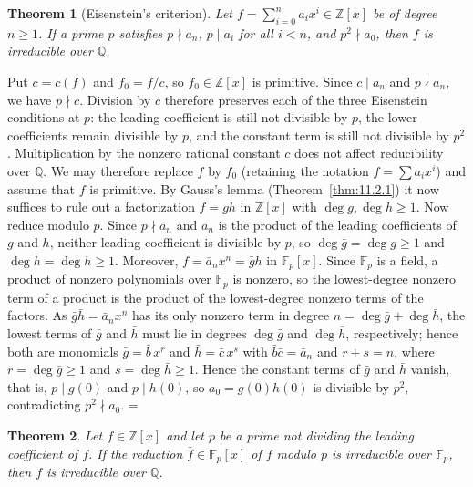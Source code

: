 \documentclass[11pt]{article}
\makeatletter
\let\nt@closedisplay\]
\def\nt@guardedclose{\@ifnextchar\par{\nt@closeafterpar}{\@ifnextchar\end{\postdisplaypenalty\@M\nt@closedisplay}{\nt@closedisplay}}}
\def\nt@closeafterpar\par{\@ifnextchar\par{\nt@closeafterpar}{\@ifnextchar\end{\postdisplaypenalty\@M\nt@closedisplay\par}{\nt@closedisplay\par}}}
\renewenvironment{proof}[1][\proofname]{\par
  \pushQED{\qed}\normalfont\topsep\medskipamount\edef\nt@afterproof{\@endparpenalty=\the\@endparpenalty\relax}\@beginparpenalty\@M\@endparpenalty\@M\let\]\nt@guardedclose\trivlist\item[]\textit{#1\@addpunct{.}} \ignorespaces}{\ifvmode\addpenalty\@M\fi\popQED\nt@afterproof\endtrivlist\@endpefalse}
\theoremstyle{ntstyle}
\newtheorem{theorem}{Theorem}[subsection]
\makeatother
\begin{document}
\begin{theorem}[Eisenstein's criterion]\label{thm:11.3.1}\label{thm:eisenstein-criterion}
  Let $f = \sum_{i=0}^n a_i x^i\in\mathbb{Z}[x]$ be of degree $n\ge1$. If a prime $p$ satisfies $p\nmid a_n$,
  $p\mid a_i$ for all $i<n$, and $p^2\nmid a_0$, then $f$ is
  irreducible over $\mathbb{Q}$.

\end{theorem}

\begin{proof} Put $c=c(f)$ and $f_0=f/c$, so $f_0\in\mathbb{Z}[x]$ is
  primitive. Since $c\mid a_n$ and $p\nmid a_n$, we have $p\nmid c$.
  Division by $c$ therefore preserves each of the three Eisenstein
  conditions at $p$: the leading coefficient is still not divisible by $p$,
  the lower coefficients remain divisible by $p$, and the constant term
  is still not divisible by $p^2$. Multiplication by the nonzero rational
  constant $c$ does not affect reducibility over $\mathbb{Q}$. We may
  therefore replace $f$ by $f_0$ (retaining the notation $f=\sum a_i x^i$)
  and assume that $f$ is primitive. By Gauss's lemma
  (Theorem~\ref{thm:11.2.1}) it now suffices to rule out a factorization $f=gh$ in
  $\mathbb{Z}[x]$ with $\deg g,\deg h\ge1$. Now reduce modulo $p$. Since $p\nmid a_n$ and $a_n$ is the product of
  the leading coefficients of $g$ and $h$, neither leading
  coefficient is divisible by $p$, so $\deg\bar g=\deg g\ge1$ and
  $\deg\bar h=\deg h\ge1$. Moreover, $\bar f = \bar a_n x^n = \bar g\bar h$
  in $\mathbb{F}_p[x]$. Since $\mathbb{F}_p$ is a field, a product of nonzero polynomials over $\mathbb{F}_p$ is
  nonzero, so the lowest-degree nonzero term of a product is the product of the lowest-degree nonzero terms of the
  factors. As $\bar g\bar h=\bar a_n x^n$ has its only nonzero term in degree $n=\deg\bar g+\deg\bar h$, the lowest
  terms of $\bar g$ and $\bar h$ must lie in degrees $\deg\bar g$ and $\deg\bar h$, respectively; hence both are
  monomials $\bar g = \bar b\,x^{r}$ and $\bar h = \bar c\,x^{s}$ with $\bar b\bar c=\bar a_n$
  and $r+s=n$, where $r=\deg\bar g\ge1$ and $s=\deg\bar h\ge1$.
  Hence the constant terms of $\bar g$ and $\bar h$ vanish, that is, $p\mid g(0)$ and $p\mid h(0)$, so
  $a_0 = g(0)h(0)$ is divisible by $p^2$,
  contradicting $p^2\nmid a_0$.
\end{proof}

\begin{theorem}\label{thm:11.3.2} Let $f\in\mathbb{Z}[x]$ and let
  $p$ be a prime not dividing the leading coefficient of $f$. If the
  reduction $\bar f\in\mathbb{F}_p[x]$ of $f$ modulo $p$ is irreducible
  over $\mathbb{F}_p$, then $f$ is irreducible over $\mathbb{Q}$.

\end{theorem}
\end{document}
